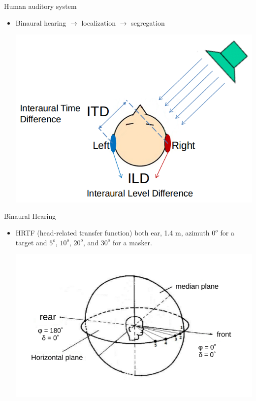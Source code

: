\begin{frame}[t]{Human auditory system}
\begin{itemize}
\item Binaural hearing $\rightarrow$ localization $\rightarrow$ segregation
\begin{center}
	\includegraphics[scale=0.35]{../pict/cpp2.png}
\end{center}
\end{itemize}
\end{frame}

\begin{frame}[t]{Binaural Hearing}
\begin{itemize}
\item HRTF (head-related transfer function) both ear, 1.4 m, azimuth $0^o$ for a target and $5^o$, $10^o$, $20^o$, and $30^o$ for a masker.
\begin{center}
	\includegraphics[scale=0.6]{../pict/binaural_hearing.pdf}
\end{center}
\end{itemize}
\end{frame}

